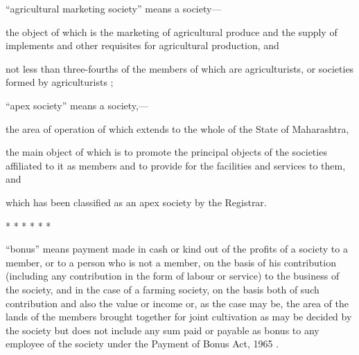 \documentclass[reprint]{mhact}
\begin{document}
      \begin{subsectionlist}
         ``agricultural marketing society'' means a
        society---

        \begin{clause}

         the object of which is the marketing of
        agricultural produce and the supply of implements and other
        requisites for agricultural production, and

         not less than
        three-fourths of the members of which are agriculturists, or
        societies formed by agriculturists ;
      \end{clause}
      
      \renewcommand{\lblprehook}{\FootnotemarkI{\thefootnoteF}[}%
        ``apex society'' means a society,---
      \begin{clause}
         the area of operation of which extends
        to the whole of the State of Maharashtra,

         the main object of which is to promote the
        principal objects of the societies affiliated to it as members
        and to provide for the facilities and services to them, and

         which has been classified as an
        apex society by the Registrar.
      \end{clause}

      

       *  * * * * *

       ``bonus'' means payment made in cash or kind out of
      the profits of a society to a member, or to a person who is not
      a member, on the basis of his contribution (including any
      contribution in the form of labour or service) to the business
      of the society, and in the case of a farming society, on the
      basis both of such contribution and also the value or income or,
      as the case may be, the area of the lands of the members brought
      together for joint cultivation as may be decided by the society
      but does not include any sum paid or payable as bonus to any
      employee of the society under the Payment of Bonus Act,
      1965%
      .
    \end{subsectionlist} 
\end{document}

